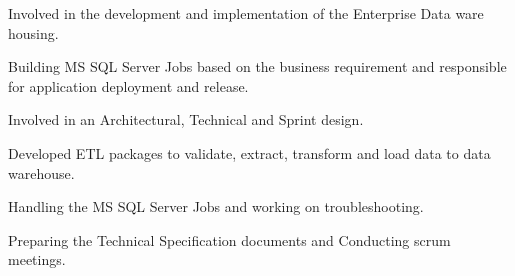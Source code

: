 \documentclass[letterpaper]{deedy-resume} %
\begin{document}
\begin{minipage}[t]{0.66\textwidth}
\begin{tightitemize}
\end{tightitemize}
\sectionspace %

\begin{tightitemize}
\item {Involved in the development and implementation of the Enterprise Data ware housing.}
\item {Building MS SQL Server Jobs based on the business requirement and responsible for application deployment and release.}
\item {Involved in an Architectural, Technical and Sprint design.}
\end{tightitemize}
\sectionspace %

\begin{tightitemize}
\item {Developed ETL packages to validate, extract, transform and load data to data warehouse.}
\item {Handling the MS SQL Server Jobs and working on troubleshooting.}
\item {Preparing the Technical Specification documents and Conducting scrum meetings.}
\end{tightitemize}
\sectionspace %


\end{minipage} %








\end{document}
